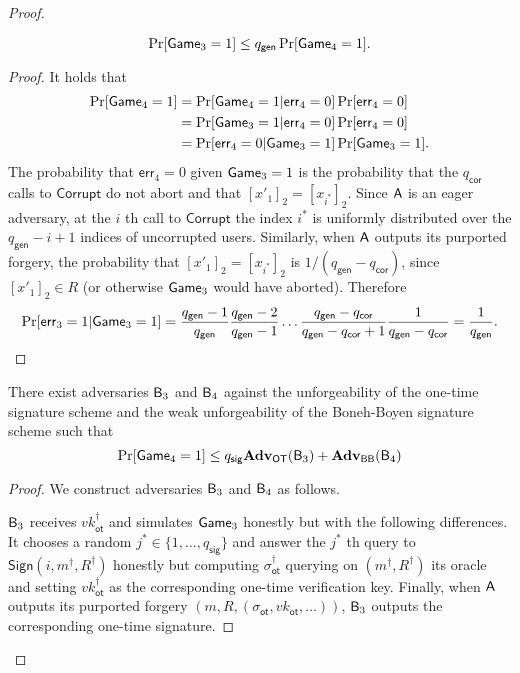 \begin{proof}
\begin{lemma}
$$
\Pr[\mathsf{Game}_3=1]\leq q_\mathsf{gen}\Pr[\mathsf{Game}_4=1].
$$
\end{lemma}
\begin{proof}
It holds that
\begin{align*}
\Pr[\mathsf{Game}_4=1] &= \Pr[\mathsf{Game}_4=1|\mathsf{err}_4=0]\Pr[\mathsf{err}_4=0]\\
&=\Pr[\mathsf{Game}_3=1|\mathsf{err}_4=0]\Pr[\mathsf{err}_4=0]\\
&=\Pr[\mathsf{err}_4=0|\mathsf{Game}_3=1]\Pr[\mathsf{Game}_3=1].
\end{align*}
The probability that $\mathsf{err}_4=0$ given $\mathsf{Game}_3=1$ is the probability that the ${q_\mathsf{cor}}$ calls to $\mathsf{Corrupt}$ do not abort and that $[x'_1]_2=[x_{i^*}]_2$. Since $\mathsf{A}$ is an eager adversary, at the $i$ th call to $\mathsf{Corrupt}$ the index $i^*$ is uniformly distributed over the ${q_\mathsf{gen}}-i+1$ indices of uncorrupted users. Similarly, when $\mathsf{A}$ outputs its purported forgery, the probability that $[x'_1]_2=[x_{i^*}]_2$ is $1/({q_\mathsf{gen}}-{q_\mathsf{cor}})$, since $[x'_1]_2\in R$ (or otherwise $\mathsf{Game}_3$ would have aborted). Therefore
$$
\Pr[\mathsf{err}_3=1|\mathsf{Game}_3=1]=\frac{{q_\mathsf{gen}}-1}{{q_\mathsf{gen}}}\frac{{q_\mathsf{gen}}-2}{{q_\mathsf{gen}}-1}\ldots\frac{{q_\mathsf{gen}}-{q_\mathsf{cor}}}{{q_\mathsf{gen}}-{q_\mathsf{cor}}+1}\frac{1}{{q_\mathsf{gen}}-{q_\mathsf{cor}}}=\frac{1}{{q_\mathsf{gen}}}.
$$ 
\end{proof}

\begin{lemma}  There exist adversaries $\mathsf{B}_3$ and $\mathsf{B}_4$ against the unforgeability of the one-time signature scheme and the weak unforgeability of the Boneh-Boyen signature scheme such that
$$
\Pr[\mathsf{Game}_4=1]\leq q_\mathsf{sig}\mathbf{Adv}_{\mathsf{OT}}(\mathsf{B}_3)+\mathbf{Adv}_{\mathsf{BB}}(\mathsf{B}_4)
$$
\end{lemma}
\begin{proof}
We construct adversaries $\mathsf{B}_3$ and $\mathsf{B}_4$ as follows.

$\mathsf{B}_3$ receives $vk_\mathsf{ot}^\dag$ and simulates $\mathsf{Game}_3$ honestly but with the following differences. It chooses a random $j^*\in\{1,\ldots, q_\mathsf{sig}\}$ and answer the $j^*$ th query to $\mathsf{Sign}(i,m^\dag,R^\dag)$ honestly but computing $\sigma_\mathsf{ot}^\dag$ querying on $(m^\dag,R^\dag)$ its oracle and setting $vk_\mathsf{ot}^\dag$ as the corresponding one-time verification key. Finally, when $\mathsf{A}$ outputs its purported forgery $(m,R,(\sigma_\mathsf{ot},vk_\mathsf{ot},\ldots))$, $\mathsf{B}_3$ outputs the corresponding one-time signature.


\end{proof}
\end{proof}
